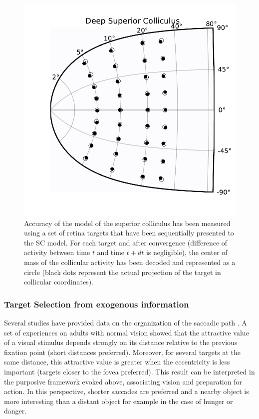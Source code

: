 \begin{figure}
  \centering
    \includegraphics[width=1.0\textwidth]{Chapitres/PublicationsSample/Chapitre/figures/accuracy}
  \caption{Accuracy of the model of the superior colliculus has been measured
    using a set of retina targets that have been
    sequentially presented to the SC model. For each target and after
    convergence (difference of activity between time $t$ and time $t+dt$ is
    negligible), the center of mass of the collicular activity has been decoded
    and represented as a circle (black dots represent the
    actual projection of the target in collicular coordinates).}
  \label{fig:accuracy}
\end{figure}

\subsubsection{Target Selection from exogenous information}

Several studies have provided data on the organization of the saccadic
path \cite{Yarbus:1967,Levy:1974,Noton:1971}. A set of
experiences on adults with normal vision showed that the attractive
value of a visual stimulus depends strongly on its distance relative
to the previous fixation point (short distances preferred). Moreover,
for several targets at the same distance, this attractive value is
greater when the eccentricity is less important (targets closer to the
fovea preferred). This result can be interpreted in the purposive
framework evoked above, associating vision and preparation for
action. In this perspective, shorter saccades are preferred and a
nearby object is more interesting than a distant object for example in
the case of hunger or danger.

